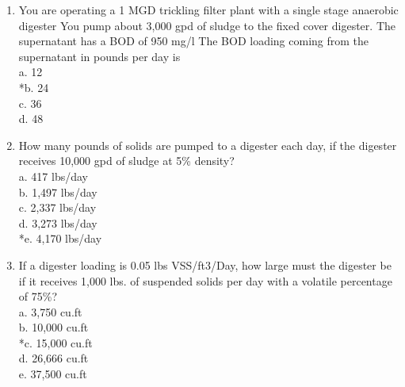 \begin{enumerate}
\item  You are operating a 1 MGD trickling filter plant with a single stage anaerobic digester You pump about 3,000 gpd of sludge to the fixed cover digester.  The supernatant has a BOD of 950 mg/l The BOD loading coming from the supernatant in pounds per day is \\

a. 12 \\
*b. 24 \\
c. 36 \\
d. 48 \\

\item  How many pounds of solids are pumped to a digester each day, if the digester receives 10,000 gpd of sludge at 5\% density? \\

a. 417 lbs/day \\
b. 1,497 lbs/day \\
c. 2,337 lbs/day \\
d. 3,273 lbs/day \\
*e. 4,170 lbs/day \\


\item  If a digester loading is 0.05 lbs VSS/ft3/Day, how large must the digester be if it receives 1,000 lbs. of suspended solids per day with a volatile percentage of 75\%? \\

a. 3,750 cu.ft \\
b. 10,000 cu.ft \\
*c. 15,000 cu.ft \\
d. 26,666 cu.ft \\
e. 37,500 cu.ft \\

\end{enumerate}

